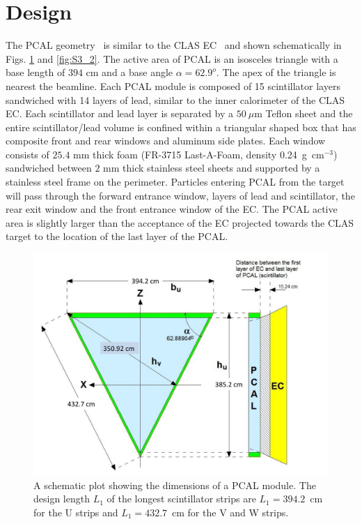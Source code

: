 \section{Design}

The PCAL geometry~\cite{2015002} is similar to the CLAS EC~\cite{clas6nim} and shown schematically in Figs. \ref{fig:S3_1} and \ref{fig:S3_2}.   The active area of PCAL is an isosceles triangle with a base length of $394$ cm and a base angle $\alpha=62.9^o$. The apex of the triangle is nearest the beamline. Each PCAL module is composed of 15 scintillator layers sandwiched with 14 layers of lead, similar to the inner calorimeter of the CLAS EC.  Each scintillator and lead layer is separated by a $50~\mu$m Teflon sheet and the entire scintillator/lead volume is confined within a triangular shaped box that has composite front and rear windows and aluminum side plates. Each window consists of $25.4$ mm thick foam (FR-3715 Last-A-Foam, density 0.24~g~cm$^{-3}$) sandwiched between $2$ mm thick stainless steel sheets and supported by a stainless steel frame on the perimeter.  Particles entering PCAL from the target will pass through the forward entrance window, layers of lead and scintillator, the rear exit window and the front entrance window of the EC.  The PCAL active area is slightly larger than the acceptance of the EC projected towards the CLAS target to the location of the last layer of the PCAL. 

\begin{figure}[hbt]
\centering
\includegraphics[width=1.0\columnwidth,keepaspectratio]{img/S3_1.pdf}
\caption[A schematic plot of PCAL]{A schematic plot showing the dimensions of a PCAL module. The design length $L_1$ of the longest scintillator strips are $L_1=394.2$~cm for the U strips and $L_1=432.7$~cm for the V and W strips. }
\label{fig:S3_1}
\end{figure}

